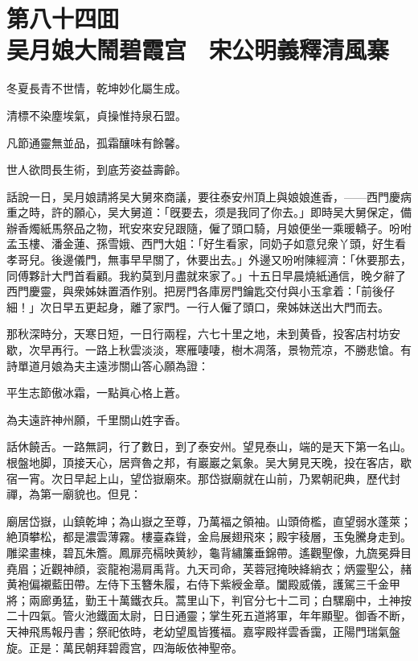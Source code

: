 
\chapter*{第八十四囬　\\吴月娘大鬧碧霞宫　宋公明義釋清風寨}


\begin{myquote}
冬夏長青不世情，乾坤妙化屬生成。

清標不染塵埃氣，貞操惟持泉石盟。

凡節通靈無並品，孤霜釀味有餘馨。

世人欲問長生術，到底芳姿益壽齡。
\end{myquote}

話說一日，吴月娘請將吴大舅來商議，要往泰安州頂上與娘娘進香，——西門慶病重之時，許的願心，吴大舅道：「旣要去，须是我同了你去。」即時吴大舅保定，備辦香燭紙馬祭品之物，玳安來安兒跟隨，僱了頭口騎，月娘便坐一乘暖轎子。吩咐孟玉樓、潘金蓮、孫雪娥、西門大姐：「好生看家，同奶子如意兒衆丫頭，好生看孝哥兒。後邊儀門，無事早早關了，休要出去。」外邊又吩咐陳經濟：「休要那去，同傅夥計大門首看顧。我約莫到月盡就來家了。」十五日早晨燒紙通信，晚夕辭了西門慶靈，與衆姊妹置酒作别。把房門各庫房門鑰匙交付與小玉拿着：「前後仔細！」次日早五更起身，離了家門。一行人僱了頭口，衆姊妹送出大門而去。

那秋深時分，天寒日短，一日行兩程，六七十里之地，未到黄昏，投客店村坊安歇，次早再行。一路上秋雲淡淡，寒雁啛啛，樹木凋落，景物荒凉，不勝悲愴。有詩單道月娘為夫主遠涉關山答心願為證：

\begin{myquote}
平生志節傲冰霜，一點眞心格上蒼。

為夫遠許神州願，千里關山姓字香。
\end{myquote}

話休饒舌。一路無詞，行了數日，到了泰安州。望見泰山，端的是天下第一名山。根盤地脚，頂接天心，居齊魯之邦，有巖巖之氣象。吴大舅見天晚，投在客店，歇宿一宵。次日早起上山，望岱嶽廟來。那岱嶽廟就在山前，乃累朝祀典，歷代封禪，為第一廟貌也。但見：

\begin{myquote}
廟居岱嶽，山鎮乾坤；為山嶽之至尊，乃萬福之領袖。山頭倚檻，直望弱水蓬萊；絶頂攀松，都是濃雲薄霧。樓臺森聳，金烏展翅飛來；殿宇稜層，玉兔騰身走到。雕梁畫棟，碧瓦朱簷。鳳扉亮槅映黄紗，龜背繡簾垂錦帶。遙觀聖像，九旒冕舜目堯眉；近觀神顔，衮龍袍湯肩禹背。九天司命，芙蓉冠掩映絳綃衣；炳靈聖公，赭黄袍偏襯藍田帶。左侍下玉簪朱履，右侍下紫綬金章。闔殿威儀，護駕三千金甲將；兩廊勇猛，勤王十萬鐵衣兵。蒿里山下，判官分七十二司；白騾廟中，土神按二十四氣。管火池鐵面太尉，日日通靈；掌生死五道將軍，年年顯聖。御香不断，天神飛馬報丹書；祭祀依時，老幼望風皆獲福。嘉寜殿祥雲香靄，正陽門瑞氣盤旋。正是：萬民朝拜碧霞宫，四海皈依神聖帝。
\end{myquote}

